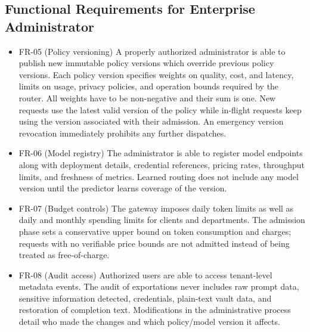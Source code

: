 \documentclass{FastFyp}
\begin{document}
\subsection{Functional Requirements for Enterprise Administrator}
\begin{itemize}
\item FR-05 (Policy versioning)
A properly authorized administrator is able to publish new immutable policy versions which override previous policy versions. Each policy version specifies weights on quality, cost, and latency, limits on usage, privacy policies, and operation bounds required by the router. All weights have to be non-negative and their sum is one. New requests use the latest valid version of the policy while in-flight requests keep using the version associated with their admission. An emergency version revocation immediately prohibits any further dispatches.
\item FR-06 (Model registry)
The administrator is able to register model endpoints along with deployment details, credential references, pricing rates, throughput limits, and freshness of metrics. Learned routing does not include any model version until the predictor learns coverage of the version.
\item FR-07 (Budget controls)
The gateway imposes daily token limits as well as daily and monthly spending limits for clients and departments. The admission phase sets a conservative upper bound on token consumption and charges; requests with no verifiable price bounds are not admitted instead of being treated as free-of-charge.
\item FR-08 (Audit access)
Authorized users are able to access tenant-level metadata events. The audit of exportations never includes raw prompt data, sensitive information detected, credentials, plain-text vault data, and restoration of completion text. Modifications in the administrative process detail who made the changes and which policy/model version it affects.
\end{itemize}
\end{document}
